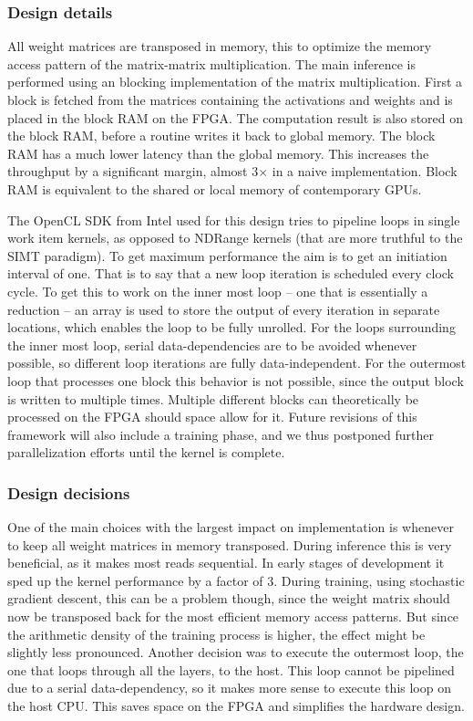 \documentclass[techrep,english]{ipsj} %
\begin{document}
\subsubsection{Design details}
All weight matrices are transposed in memory, this to optimize the memory access pattern of the matrix-matrix multiplication.
The main inference is performed using an blocking implementation of the matrix multiplication.
First a block is fetched from the matrices containing the activations and weights and is placed in the block RAM on the FPGA.
The computation result is also stored on the block RAM, before a routine writes it back to global memory.
The block RAM has a much lower latency than the global memory.
This increases the throughput by a significant margin, almost 3\(\times\) in a naive implementation.
Block RAM is equivalent to the shared or local memory of contemporary GPUs.

The OpenCL SDK from Intel used for this design tries to pipeline loops in single work item kernels, as opposed to NDRange kernels (that are more truthful to the SIMT paradigm).
To get maximum performance the aim is to get an initiation interval of one.
That is to say that a new loop iteration is scheduled every clock cycle.
To get this to work on the inner most loop -- one that is essentially a reduction -- an array is used to store the output of every iteration in separate locations, which enables the loop to be fully unrolled.
For the loops surrounding the inner most loop, serial data-dependencies are to be avoided whenever possible, so different loop iterations are fully data-independent.
For the outermost loop that processes one block this behavior is not possible, since the output block is written to multiple times.
Multiple different blocks can theoretically be processed on the FPGA should space allow for it.
Future revisions of this framework will also include a training phase, and we thus postponed further parallelization efforts until the kernel is complete.

\subsubsection{Design decisions}
One of the main choices with the largest impact on implementation is whenever to keep all weight matrices in memory transposed.
During inference this is very beneficial, as it makes most reads sequential.
In early stages of development it sped up the kernel performance by a factor of \num{3}.
During training, using stochastic gradient descent, this can be a problem though, since the weight matrix should now be transposed back for the most efficient memory access patterns.
But since the arithmetic density of the training process is higher, the effect might be slightly less pronounced.
Another decision was to execute the outermost loop, the one that loops through all the layers, to the host.
This loop cannot be pipelined due to a serial data-dependency, so it makes more sense to execute this loop on the host CPU.
This saves space on the FPGA and simplifies the hardware design.
\end{document}
